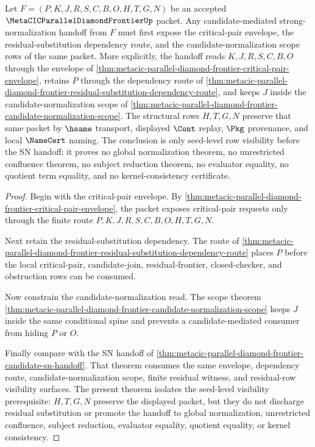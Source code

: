 \begin{theorem}
\label{thm:metacic-parallel-diamond-seed-closure}
Let $F=(P,K,J,R,S,C,B,O,H,T,G,N)$ be an accepted $\MetaCICParallelDiamondFrontierUp$ packet. Any candidate-mediated strong-normalization handoff from $F$ must first expose the critical-pair envelope, the residual-substitution dependency route, and the candidate-normalization scope rows of the same packet. More explicitly, the handoff reads $K,J,R,S,C,B,O$ through the envelope of \autoref{thm:metacic-parallel-diamond-frontier-critical-pair-envelope}, retains $P$ through the dependency route of \autoref{thm:metacic-parallel-diamond-frontier-residual-substitution-dependency-route}, and keeps $J$ inside the candidate-normalization scope of \autoref{thm:metacic-parallel-diamond-frontier-candidate-normalization-scope}. The structural rows $H,T,G,N$ preserve that same packet by $\hsame$ transport, displayed $\Cont$ replay, $\Pkg$ provenance, and local $\NameCert$ naming. The conclusion is only seed-level row visibility before the SN handoff; it proves no global normalization theorem, no unrestricted confluence theorem, no subject reduction theorem, no evaluator equality, no quotient term equality, and no kernel-consistency certificate.
\end{theorem}
\begin{proof}
Begin with the critical-pair envelope. By \autoref{thm:metacic-parallel-diamond-frontier-critical-pair-envelope}, the packet exposes critical-pair requests only through the finite route $P,K,J,R,S,C,B,O,H,T,G,N$.

Next retain the residual-substitution dependency. The route of \autoref{thm:metacic-parallel-diamond-frontier-residual-substitution-dependency-route} places $P$ before the local critical-pair, candidate-join, residual-frontier, closed-checker, and obstruction rows can be consumed.

Now constrain the candidate-normalization read. The scope theorem \autoref{thm:metacic-parallel-diamond-frontier-candidate-normalization-scope} keeps $J$ inside the same conditional spine and prevents a candidate-mediated consumer from hiding $P$ or $O$.

Finally compare with the SN handoff of \autoref{thm:metacic-parallel-diamond-frontier-candidate-sn-handoff}. That theorem consumes the same envelope, dependency route, candidate-normalization scope, finite residual witness, and residual-row visibility surfaces. The present theorem isolates the seed-level visibility prerequisite: $H,T,G,N$ preserve the displayed packet, but they do not discharge residual substitution or promote the handoff to global normalization, unrestricted confluence, subject reduction, evaluator equality, quotient equality, or kernel consistency.
\end{proof}
